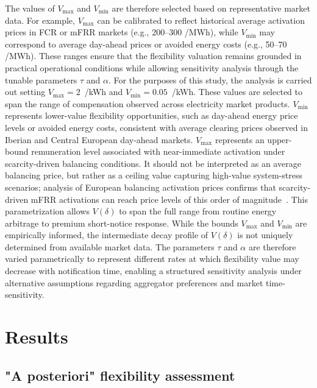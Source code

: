 \documentclass[preprint,12pt]{elsarticle}
\begin{document}
The values of \( V_{\max} \) and \( V_{\min} \) are therefore selected based on representative market data. For example, \( V_{\max} \) can be calibrated to reflect historical average activation prices in FCR or mFRR markets (e.g., 200–300 \texteuro/MWh), while \( V_{\min} \) may correspond to average day-ahead prices or avoided energy costs (e.g., 50–70 \texteuro/MWh). These ranges ensure that the flexibility valuation remains grounded in practical operational conditions while allowing sensitivity analysis through the tunable parameters \( \tau \) and \( \alpha \). For the purposes of this study, the analysis is carried out setting $V_{\max} = 2$~\texteuro/kWh and $V_{\min} = 0.05$~\texteuro/kWh. These values are selected to span the range of compensation observed across electricity market products. $V_{\min}$ represents lower-value flexibility opportunities, such as day-ahead energy price levels or avoided energy costs, consistent with average clearing prices observed in Iberian and Central European day-ahead markets. $V_{\max}$ represents an upper-bound remuneration level associated with near-immediate activation under scarcity-driven balancing conditions. It should not be interpreted as an average balancing price, but rather as a ceiling value capturing high-value system-stress scenarios; analysis of European balancing activation prices confirms that scarcity-driven mFRR activations can reach price levels of this order of magnitude~\cite{entsoe_balancing}. This parametrization allows $V(\delta)$ to span the full range from routine energy arbitrage to premium short-notice response. While the bounds $V_{\max}$ and $V_{\min}$ are empirically informed, the intermediate decay profile of $V(\delta)$ is not uniquely determined from available market data. The parameters $\tau$ and $\alpha$ are therefore varied parametrically to represent different rates at which flexibility value may decrease with notification time, enabling a structured sensitivity analysis under alternative assumptions regarding aggregator preferences and market time-sensitivity.



\section{Results}\label{results}


\subsection{"A posteriori" flexibility assessment} \label{a_posteriori_results}
\end{document}
